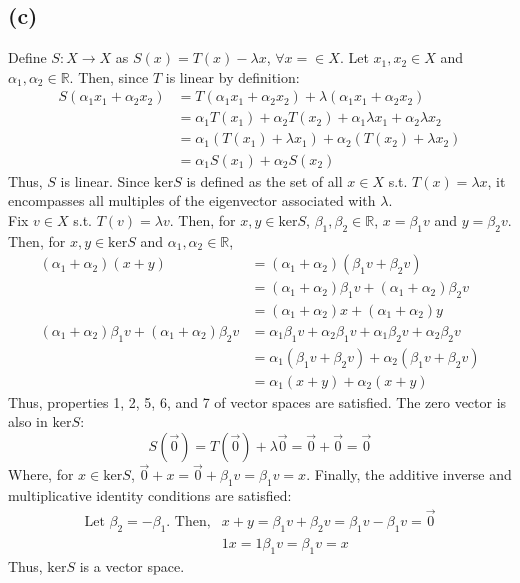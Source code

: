 \documentclass{article}
\newcommand{\R}{\mathbb{R}}
\begin{document}
\subsection*{(c)}
Define $S:X\rightarrow X$ as $S(x)=T(x)-\lambda x$, $\forall x=\in X$. Let $x_1,x_2\in X$ and $\alpha_1,\alpha_2\in\R$. Then, since $T$ is linear by definition:
\begin{align*}
	S(\alpha_1 x_1 + \alpha_2 x_2) 	&= T(\alpha_1 x_1 + \alpha_2 x_2) + \lambda(\alpha_1 x_1 + \alpha_2 x_2)	\\
									&= \alpha_1 T(x_1)+\alpha_2 T(x_2)+\alpha_1\lambda x_1+\alpha_2\lambda x_2 	\\
									&= \alpha_1(T(x_1)+\lambda x_1) + \alpha_2(T(x_2)+\lambda x_2) 				\\
									&= \alpha_1 S(x_1) + \alpha_2 S(x_2)
\end{align*}
Thus, $S$ is linear. Since $\text{ker}S$ is defined as the set of all $x\in X$ s.t. $T(x)=\lambda x$, it encompasses all multiples of the eigenvector associated with $\lambda$.
\smallskip \\
Fix $v\in X$ s.t. $T(v)=\lambda v$. Then, for $x,y\in\text{ker}S$, $\beta_1,\beta_2\in\R$, $x=\beta_1 v$ and $y=\beta_2 v$. Then, for $x,y\in\text{ker}S$ and $\alpha_1,\alpha_2\in\R$,
\begin{align*}
	(\alpha_1+\alpha_2)(x+y)	&=(\alpha_1+\alpha_2)(\beta_1 v+\beta_2 v)						\\
								&=(\alpha_1+\alpha_2)\beta_1 v+(\alpha_1+\alpha_2)\beta_2 v 	\\
								&= (\alpha_1+\alpha_2) x+(\alpha_1+\alpha_2) y 					\\
	(\alpha_1+\alpha_2)\beta_1 v+(\alpha_1+\alpha_2)\beta_2 v &= \alpha_1\beta_1 v + \alpha_2\beta_1 v + \alpha_1\beta_2 v + \alpha_2\beta_2 v 																			\\
								&= \alpha_1(\beta_1 v + \beta_2 v) + \alpha_2(\beta_1 v+\beta_2 v) \\
								&= \alpha_1(x+y)+\alpha_2(x+y)
\end{align*}
Thus, properties 1, 2, 5, 6, and 7 of vector spaces are satisfied. The zero vector is also in $\text{ker}S$: 
\[
	S(\vec{0})=T(\vec{0})+\lambda\vec{0}=\vec{0}+\vec{0}=\vec{0}
\]
Where, for $x\in\text{ker}S$, $\vec{0}+ x=\vec{0}+ \beta_1 v = \beta_1 v = x$. Finally, the additive inverse and multiplicative identity conditions are satisfied:
\begin{align*}
	\text{Let }\beta_2=-\beta_1\text{. Then,} & x+y=\beta_1 v + \beta_2 v = \beta_1 v-\beta_1 v = \vec{0} \\
	& 1x = 1\beta_1 v =\beta_1 v = x
\end{align*}
Thus, $\text{ker}S$ is a vector space.
\end{document}
